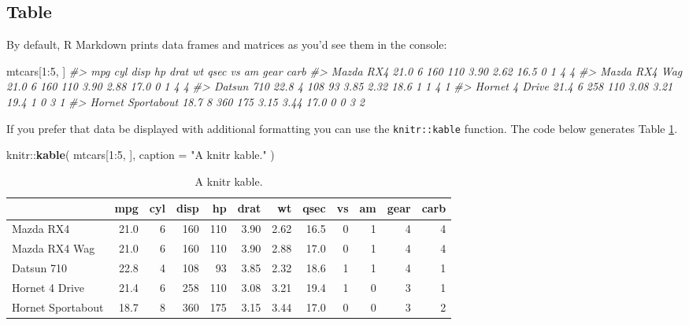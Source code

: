 \documentclass[]{book}
\newenvironment{Shaded}{\begin{snugshade}}{\end{snugshade}}
\newcommand{\KeywordTok}[1]{\textcolor[rgb]{0.13,0.29,0.53}{\textbf{{#1}}}}
\newcommand{\DataTypeTok}[1]{\textcolor[rgb]{0.13,0.29,0.53}{{#1}}}
\newcommand{\DecValTok}[1]{\textcolor[rgb]{0.00,0.00,0.81}{{#1}}}
\newcommand{\StringTok}[1]{\textcolor[rgb]{0.31,0.60,0.02}{{#1}}}
\newcommand{\CommentTok}[1]{\textcolor[rgb]{0.56,0.35,0.01}{\textit{{#1}}}}
\newcommand{\NormalTok}[1]{{#1}}
\begin{document}
\subsection{Table}\label{table}

By default, R Markdown prints data frames and matrices as you'd see them
in the console:

\begin{Shaded}
\begin{Highlighting}[]
\NormalTok{mtcars[}\DecValTok{1}\NormalTok{:}\DecValTok{5}\NormalTok{, ]}
\CommentTok{#>                    mpg cyl disp  hp drat   wt qsec vs am gear carb}
\CommentTok{#> Mazda RX4         21.0   6  160 110 3.90 2.62 16.5  0  1    4    4}
\CommentTok{#> Mazda RX4 Wag     21.0   6  160 110 3.90 2.88 17.0  0  1    4    4}
\CommentTok{#> Datsun 710        22.8   4  108  93 3.85 2.32 18.6  1  1    4    1}
\CommentTok{#> Hornet 4 Drive    21.4   6  258 110 3.08 3.21 19.4  1  0    3    1}
\CommentTok{#> Hornet Sportabout 18.7   8  360 175 3.15 3.44 17.0  0  0    3    2}
\end{Highlighting}
\end{Shaded}

If you prefer that data be displayed with additional formatting you can
use the \texttt{knitr::kable} function. The code below generates Table
\ref{tab:kable}.

\begin{Shaded}
\begin{Highlighting}[]
\NormalTok{knitr::}\KeywordTok{kable}\NormalTok{(}
  \NormalTok{mtcars[}\DecValTok{1}\NormalTok{:}\DecValTok{5}\NormalTok{, ], }
  \DataTypeTok{caption =} \StringTok{"A knitr kable."}
\NormalTok{)}
\end{Highlighting}
\end{Shaded}

\begin{table}

\caption{\label{tab:kable}A knitr kable.}
\centering
\begin{tabular}[t]{l|r|r|r|r|r|r|r|r|r|r|r}
\hline
  & mpg & cyl & disp & hp & drat & wt & qsec & vs & am & gear & carb\\
\hline
Mazda RX4 & 21.0 & 6 & 160 & 110 & 3.90 & 2.62 & 16.5 & 0 & 1 & 4 & 4\\
\hline
Mazda RX4 Wag & 21.0 & 6 & 160 & 110 & 3.90 & 2.88 & 17.0 & 0 & 1 & 4 & 4\\
\hline
Datsun 710 & 22.8 & 4 & 108 & 93 & 3.85 & 2.32 & 18.6 & 1 & 1 & 4 & 1\\
\hline
Hornet 4 Drive & 21.4 & 6 & 258 & 110 & 3.08 & 3.21 & 19.4 & 1 & 0 & 3 & 1\\
\hline
Hornet Sportabout & 18.7 & 8 & 360 & 175 & 3.15 & 3.44 & 17.0 & 0 & 0 & 3 & 2\\
\hline
\end{tabular}
\end{table}
\end{document}
